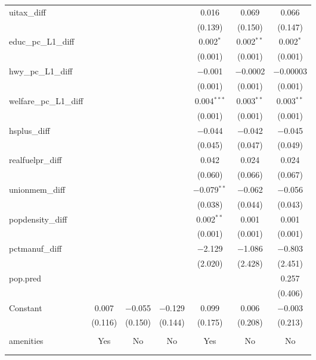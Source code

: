 \begin{table}[!htbp]
\begin{tabular}{@{\extracolsep{5pt}}lcccccc}
  uitax\_diff &  &  &  & 0.016 & 0.069 & 0.066 \\ 
  &  &  &  & (0.139) & (0.150) & (0.147) \\ 
  educ\_pc\_L1\_diff &  &  &  & 0.002$^{*}$ & 0.002$^{**}$ & 0.002$^{*}$ \\ 
  &  &  &  & (0.001) & (0.001) & (0.001) \\ 
  hwy\_pc\_L1\_diff &  &  &  & $-$0.001 & $-$0.0002 & $-$0.00003 \\ 
  &  &  &  & (0.001) & (0.001) & (0.001) \\ 
  welfare\_pc\_L1\_diff &  &  &  & 0.004$^{***}$ & 0.003$^{**}$ & 0.003$^{**}$ \\ 
  &  &  &  & (0.001) & (0.001) & (0.001) \\ 
  hsplus\_diff &  &  &  & $-$0.044 & $-$0.042 & $-$0.045 \\ 
  &  &  &  & (0.045) & (0.047) & (0.049) \\ 
  realfuelpr\_diff &  &  &  & 0.042 & 0.024 & 0.024 \\ 
  &  &  &  & (0.060) & (0.066) & (0.067) \\ 
  unionmem\_diff &  &  &  & $-$0.079$^{**}$ & $-$0.062 & $-$0.056 \\ 
  &  &  &  & (0.038) & (0.044) & (0.043) \\ 
  popdensity\_diff &  &  &  & 0.002$^{**}$ & 0.001 & 0.001 \\ 
  &  &  &  & (0.001) & (0.001) & (0.001) \\ 
  pctmanuf\_diff &  &  &  & $-$2.129 & $-$1.086 & $-$0.803 \\ 
  &  &  &  & (2.020) & (2.428) & (2.451) \\ 
  pop.pred &  &  &  &  &  & 0.257 \\ 
  &  &  &  &  &  & (0.406) \\ 
  Constant & 0.007 & $-$0.055 & $-$0.129 & 0.099 & 0.006 & $-$0.003 \\ 
  & (0.116) & (0.150) & (0.144) & (0.175) & (0.208) & (0.213) \\ 
 \hline \\[-1.8ex] 
amenities & Yes & No & No & Yes & No & No \\ 
\hline \\[-1.8ex] 
\hline 
\hline \\[-1.8ex] 
\end{tabular} 
\end{table} 

